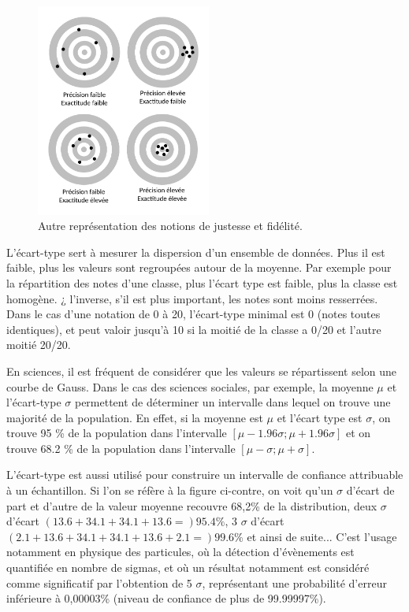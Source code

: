 \begin{figure}
    \centering
    \includegraphics[height=7cm]{assets/figures/juste-fidèle-précis.pdf}
    \caption{Autre représentation des notions de justesse et fidélité.}
    \label{fig:juste_fidele_precis}
\end{figure}

L'écart-type sert à mesurer la dispersion d'un ensemble de données. Plus il est faible, plus les valeurs sont regroupées autour de la moyenne. Par exemple pour la répartition des notes d'une classe, plus l'écart type est faible, plus la classe est homogène. ¿ l'inverse, s'il est plus important, les notes sont moins resserrées. Dans le cas d'une notation de 0 à 20, l'écart-type minimal est 0 (notes toutes identiques), et peut valoir jusqu'à 10 si la moitié de la classe a 0/20 et l'autre moitié 20/20.

En sciences, il est fréquent de considérer que les valeurs se répartissent selon une courbe de Gauss. Dans le cas des sciences sociales, par exemple, la moyenne $\mu$ et l'écart-type $\sigma$ permettent de déterminer un intervalle dans lequel on trouve une majorité de la population. En effet, si la moyenne est $\mu$ et l'écart type est $\sigma$, on trouve 95 \% de la population dans l'intervalle $[ \mu - 1.96 \sigma ; \mu + 1.96 \sigma ]$ et on trouve 68.2 \% de la population dans l'intervalle $[ \mu - \sigma ; \mu + \sigma ]$.

L'écart-type est aussi utilisé pour construire un intervalle de confiance attribuable à un échantillon. Si l'on se réfère à la figure ci-contre, on voit qu'un $\sigma$ d'écart de part et d'autre de la valeur moyenne recouvre 68,2\% de la distribution, deux $\sigma$ d'écart $(13.6+34.1+34.1+13.6 =) 95.4\%$, 3 $\sigma$ d'écart $(2.1+13.6+34.1+34.1+13.6+2.1 =) 99.6\%$ et ainsi de suite... C'est l'usage notamment en physique des particules, où la détection d'évènements est quantifiée en nombre de sigmas, et où un résultat notamment est considéré comme significatif par l'obtention de 5 $\sigma$, représentant une probabilité d'erreur inférieure à 0,00003\% (niveau de confiance de plus de 99.99997\%).

